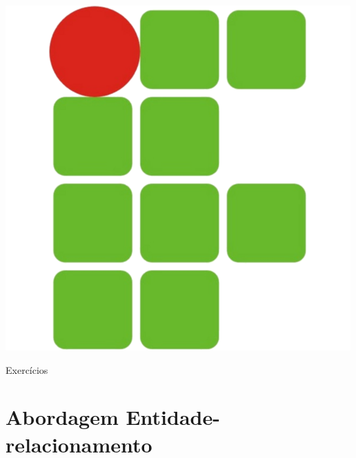 \documentclass[11pt]{article}
\begin{document}
	
	\pagestyle{fancy}
	\renewcommand{\headrulewidth}{0pt}
	\renewcommand{\footrulewidth}{2.1pt}
	
	\begin{minipage}[c][1.5cm][c]{3cm}
		\begin{flushleft}
			\includegraphics[scale=0.25]{IFRN}
		\end{flushleft}
	\end{minipage}		
	\begin{minipage}[c][1.5cm][c]{10.8cm}
		\begin{center}
			\par
			\par
			\resizebox{!}{0.2cm}{\today}
		\end{center}
	\end{minipage}
	
	\begin{center}
		Exercícios
	\end{center}
	
	\section{Abordagem Entidade-relacionamento}
	
\end{document}
